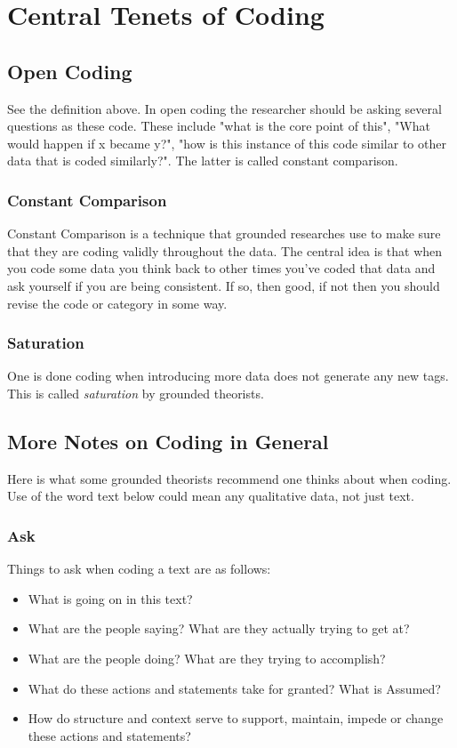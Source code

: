 \documentclass[10pt, letterpaper]{article}
\begin{document}
\section*{Central Tenets of Coding}
\label{sec:orgbb6ade5}

\subsection*{Open Coding}
\label{sec:org04e94c6}
See the definition above. In open coding the researcher should be asking
several questions as these code. These include "what is the core point of
this", "What would happen if x became y?", "how is this instance of this code
similar to other data that is coded similarly?". The latter is called
constant comparison.

\subsubsection*{Constant Comparison}
\label{sec:org1ef068e}
Constant Comparison is a technique that grounded researches use to make sure
that they are coding validly throughout the data. The central idea is that
when you code some data you think back to other times you've coded that data
and ask yourself if you are being consistent. If so, then good, if not then
you should revise the code or category in some way.

\subsubsection*{Saturation}
\label{sec:org8d13129}
One is done coding when introducing more data does not generate any new
tags. This is called \emph{saturation} by grounded theorists.

\subsection*{More Notes on Coding in General}
\label{sec:org8cae116}
Here is what some grounded theorists recommend one thinks about when coding. Use of the word text below could mean any qualitative data, not just text.

\subsubsection*{Ask}
\label{sec:org64ddd39}
Things to ask when coding a text are as follows:
\begin{itemize}
\item What is going on in this text?
\item What are the people saying? What are they actually trying to get at?
\item What are the people doing? What are they trying to accomplish?
\item What do these actions and statements take for granted? What is Assumed?
\item How do structure and context serve to support, maintain, impede or change these actions and statements?
\end{itemize}
\end{document}
